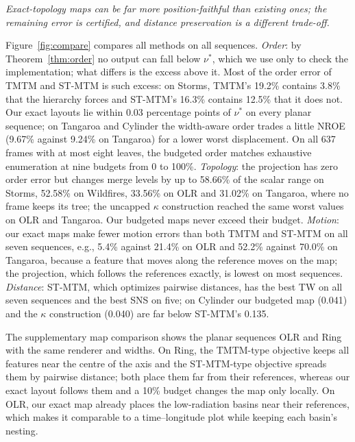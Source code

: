 \documentclass[review]{vgtc}                 %
\newcommand{\takeaway}[1]{\noindent\emph{#1}\par\smallskip}
\begin{document}
\takeaway{Exact-topology maps can be far more position-faithful than existing ones; the remaining error is certified, and distance preservation is a different trade-off.}
Figure~\ref{fig:compare} compares all methods on all sequences. \emph{Order}: by Theorem~\ref{thm:order} no output can fall below $\nu^*$, which we use only to check the implementation; what differs is the excess above it. Most of the order error of TMTM and ST-MTM is such excess: on Storms, TMTM's 19.2\% contains 3.8\% that the hierarchy forces and ST-MTM's 16.3\% contains 12.5\% that it does not. Our exact layouts lie within 0.03 percentage points of $\nu^*$ on every planar sequence; on Tangaroa and Cylinder the width-aware order trades a little NROE (9.67\% against 9.24\% on Tangaroa) for a lower worst displacement. On all 637 frames with at most eight leaves, the budgeted order matches exhaustive enumeration at nine budgets from 0 to 100\%. \emph{Topology}: the projection has zero order error but changes merge levels by up to 58.66\% of the scalar range on Storms, 52.58\% on Wildfires, 33.56\% on OLR and 31.02\% on Tangaroa, where no frame keeps its tree; the uncapped $\kappa$ construction reached the same worst values on OLR and Tangaroa. Our budgeted maps never exceed their budget. \emph{Motion}: our exact maps make fewer motion errors than both TMTM and ST-MTM on all seven sequences, e.g., 5.4\% against 21.4\% on OLR and 52.2\% against 70.0\% on Tangaroa, because a feature that moves along the reference moves on the map; the projection, which follows the references exactly, is lowest on most sequences. \emph{Distance}: ST-MTM, which optimizes pairwise distances, has the best TW on all seven sequences and the best SNS on five; on Cylinder our budgeted map (0.041) and the $\kappa$ construction (0.040) are far below ST-MTM's 0.135.

The supplementary map comparison shows the planar sequences OLR and Ring with the same renderer and widths. On Ring, the TMTM-type objective keeps all features near the centre of the axis and the ST-MTM-type objective spreads them by pairwise distance; both place them far from their references, whereas our exact layout follows them and a 10\% budget changes the map only locally. On OLR, our exact map already places the low-radiation basins near their references, which makes it comparable to a time--longitude plot while keeping each basin's nesting.
\end{document}
